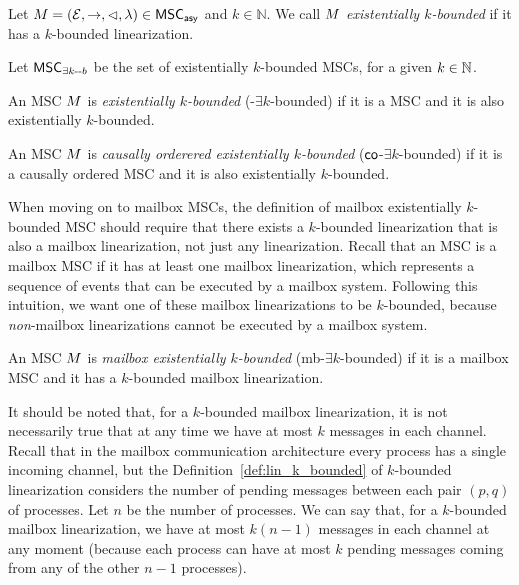 \begin{definition}\label{def:ek_bounded_msc}
	Let $M = (\mathcal{E}, \rightarrow, \lhd, \lambda) \in \mathsf{MSC}_{\mathsf{asy}}$ and $k \in \mathbb{N}$. We call $M$ \emph{existentially $k$-bounded} if it has a $k$-bounded linearization.
\end{definition}
Let $\mathsf{MSC}_{\exists k\text{-}\text{-}b}$ be the set of existentially $k$-bounded MSCs, for a given $k \in \mathbb{N}$.
\begin{definition}
	An MSC $M$ is \emph{\pp existentially $k$-bounded} (\pp-$\exists k$-bounded) if it is a \pp MSC and it is also existentially $k$-bounded.
\end{definition}
\begin{definition}
	An MSC $M$ is \emph{causally orderered existentially $k$-bounded} ($\mathsf{co}$-$\exists k$-bounded) if it is a causally ordered MSC and it is also existentially $k$-bounded.
\end{definition}
When moving on to mailbox MSCs, the definition of mailbox existentially $k$-bounded MSC should require that there exists a $k$-bounded linearization that is also a mailbox linearization, not just any linearization. Recall that an MSC is a mailbox MSC if it has at least one mailbox linearization, which represents a sequence of events that can be executed by a mailbox system. Following this intuition, we want one of these mailbox linearizations to be $k$-bounded, because \emph{non}-mailbox linearizations cannot be executed by a mailbox system.
\begin{definition}
	An MSC $M$ is \emph{mailbox existentially $k$-bounded} (mb-$\exists k$-bounded) if it is a mailbox MSC and it has a $k$-bounded mailbox linearization.
\end{definition}
It should be noted that, for a $k$-bounded mailbox linearization, it is not necessarily true that at any time we have at most $k$ messages in each channel. Recall that in the mailbox communication architecture every process has a single incoming channel, but the Definition~\ref{def:lin_k_bounded} of $k$-bounded linearization considers the number of pending messages between each pair $(p,q)$ of processes. Let $n$ be the number of processes. We can say that, for a $k$-bounded mailbox linearization, we have at most $k(n-1)$ messages in each channel at any moment (because each process can have at most $k$ pending messages coming from any of the other $n-1$ processes).

